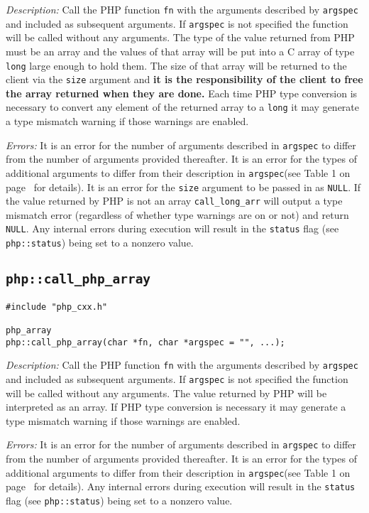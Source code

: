 \documentclass[11pt,titlepage]{article}
\begin{document}
\emph{Description:} Call the PHP function \verb|fn| with the arguments described by \verb|argspec| and included as subsequent arguments. If \verb|argspec| is not specified the function will be called without any arguments. The type of the value returned from PHP must be an array and the values of that array will be put into a C array of type \verb|long| large enough to hold them. The size of that array will be returned to the client via the \verb|size| argument and \textbf{it is the responsibility of the client to free the array returned when they are done.} Each time PHP type conversion is necessary to convert any element of the returned array to a \verb|long| it may generate a type mismatch warning if those warnings are enabled.

\emph{Errors:} It is an error for the number of arguments described in \verb|argspec| to differ from the number of arguments provided thereafter. It is an error for the types of additional arguments to differ from their description in \verb|argspec|(see Table 1 on page~\pageref{Table1} for details). It is an error for the \verb|size| argument to be passed in as \verb|NULL|. If the value returned by PHP is not an array \verb|call_long_arr| will output a type mismatch error (regardless of whether type warnings are on or not) and return \verb|NULL|. Any internal errors during execution will result in the \verb|status| flag (see \verb|php::status|) being set to a nonzero value.


\subsection{\texttt{php::call\_php\_array}}

\begin{verbatim}
#include "php_cxx.h"

php_array 
php::call_php_array(char *fn, char *argspec = "", ...);
\end{verbatim}

\emph{Description:} Call the PHP function \verb|fn| with the arguments described by \verb|argspec| and included as subsequent arguments. If \verb|argspec| is not specified the function will be called without any arguments. The value returned by PHP will be interpreted as an array. If PHP type conversion is necessary it may generate a type mismatch warning if those warnings are enabled.

\emph{Errors:} It is an error for the number of arguments described in \verb|argspec| to differ from the number of arguments provided thereafter. It is an error for the types of additional arguments to differ from their description in \verb|argspec|(see Table 1 on page~\pageref{Table1} for details). Any internal errors during execution will result in the \verb|status| flag (see \verb|php::status|) being set to a nonzero value.
\end{document}
